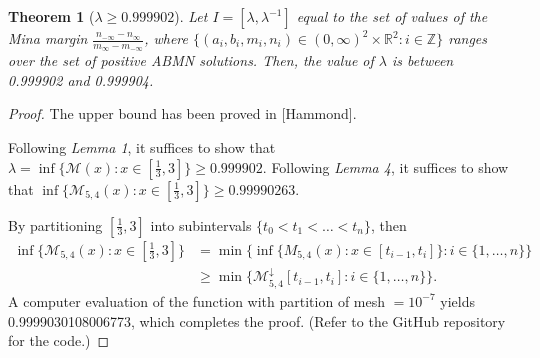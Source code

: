 \documentclass{article}
\newtheorem{theorem}{Theorem}
\newcommand*{\R}{\mathbb{R}}
\newcommand*{\M}{\mathcal{M}}
\begin{document}
\begin{theorem}[$\lambda \geq 0.999902$]
    Let $I=[\lambda,\lambda^{-1}]$ equal to the set of values of the Mina margin
    $\frac{n_{-\infty}-n_{\infty}}{m_{\infty}-m_{-\infty}}$, where $\{(a_i, b_i, m_i,
    n_i)\in(0,\infty)^2\times \R^2:i\in\mathbb{Z}\}$ ranges over the set of positive ABMN solutions.
    Then, the value of $\lambda$ is between 0.999902 and 0.999904.
\end{theorem}
\begin{proof}
    The upper bound has been proved in [Hammond].

    Following \emph{Lemma 1}, it suffices to show that
    $\lambda=\inf\{\M(x):x\in[\frac{1}{3},3]\}\geq0.999902$. Following \emph{Lemma 4}, it suffices
    to show that $\inf\{\M_{5,4}(x):x\in[\frac{1}{3},3]\}\geq 0.99990263$.

    By partitioning $[\frac{1}{3},3]$ into subintervals $\{t_0<t_1<\dots<t_n\}$, then 
    \begin{align*}
        \inf\{\M_{5,4}(x):x\in[\frac{1}{3},3]\} & =
        \min\{\inf\{M_{5,4}(x):x\in[t_{i-1},t_i]\}:i\in\{1,\dots,n\}\} \\
        & \geq \min\{\M^\downarrow_{5,4}[t_{i-1},t_i]:i\in\{1,\dots,n\}\}.
    \end{align*}
    A computer evaluation of the function with partition of mesh $=10^{-7}$ yields
    0.9999030108006773, which completes the proof. (Refer to the GitHub repository for the code.)
\end{proof}
\end{document}
